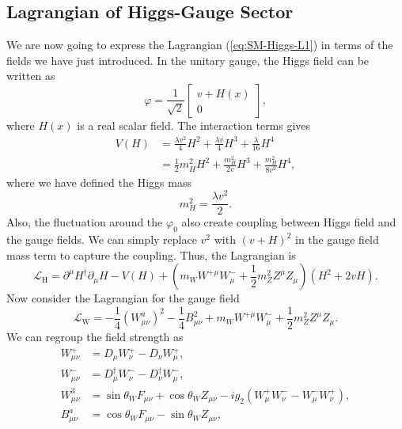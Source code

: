 \subsection{Lagrangian of Higgs-Gauge Sector}
We are now going to express the Lagrangian (\ref{eq:SM-Higgs-L1}) in terms of the fields we have just introduced.
In the unitary gauge, the Higgs field can be written as
\begin{equation}
	\varphi = \frac{1}{\sqrt 2} \begin{bmatrix}
		v + H(x) \\ 0
	\end{bmatrix},
\end{equation}
where $H(x)$ is a real scalar field.
The interaction terms gives
\begin{equation}
\begin{aligned}
	V(H) &= \frac{\lambda v^2}{4} H^2 + \frac{\lambda v}{4}H^3 + \frac{\lambda}{16}H^4 \\
	&= \frac{1}{2}m_H^2 H^2 + \frac{m_H^2}{2v} H^3 + \frac{m_H^2}{8v^2}H^4,
\end{aligned} 
\end{equation}
where we have defined the Higgs mass
\begin{equation}
	m_H^2 = \frac{\lambda v^2}{2}.
\end{equation}
Also, the fluctuation around the $\varphi_0$ also create coupling between Higgs field and the gauge fields.
We can simply replace $v^2$ with $(v+H)^2$ in the gauge field mass term to capture the coupling.
Thus, the Lagrangian is
\begin{equation}
	\mathcal L_{\mathrm{H}} = \partial^\mu H^\dagger \partial_\mu H - V(H) + \left(m_W W^{+\mu} W_\mu^- + \frac{1}{2}m_Z^2 Z^\mu Z_\mu \right) \left(H^2+2vH \right).
\end{equation}
Now consider the Lagrangian for the gauge field
\begin{equation}
	\mathcal L_\mathrm{W} = -\frac{1}{4}(W^a_{\mu\nu})^2 - \frac{1}{4}B_{\mu\nu}^2 + m_W W^{+\mu} W_\mu^- + \frac{1}{2}m_Z^2 Z^\mu Z_\mu.
\end{equation}
We can regroup the field strength as
\begin{equation}
\begin{aligned}
	W^+_{\mu\nu} &= D_\mu W_\nu^+ - D_\nu W^+_\mu, \\
	W^-_{\mu\nu} &= D_\mu^\dagger W_\nu^- - D_\nu^\dagger W^-_\mu, \\
	W^3_{\mu\nu} &= \sin{\theta_W} F_{\mu\nu} + \cos{\theta_W}Z_{\mu\nu} -ig_2(W^+_\mu W^-_\nu - W_\mu^- W_\nu^+), \\
	B^a_{\mu\nu} &= \cos{\theta_W} F_{\mu\nu} - \sin{\theta_W} Z_{\mu\nu},
\end{aligned}
\end{equation}
